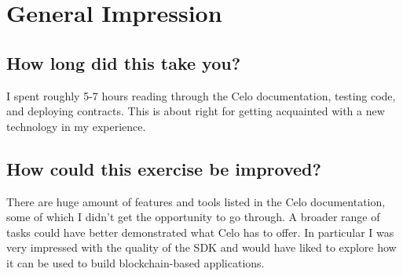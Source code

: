 \documentclass[a4paper,11pt]{article}
\begin{document}
\section*{General Impression}
\subsection*{How long did this take you?}
I spent roughly 5-7 hours reading through the Celo documentation, testing code,
and deploying contracts.  This is about right for getting acquainted with a new
technology in my experience.
\subsection*{How could this exercise be improved?}
There are huge amount of features and tools listed in the Celo documentation,
some of which I didn't get the opportunity to go through.  A broader range
of tasks could have better demonstrated what Celo has to offer.  In particular I
was very impressed with the quality of the SDK and would have liked to explore
how it can be used to build blockchain-based applications.
\end{document}
